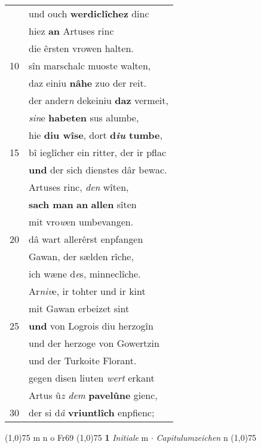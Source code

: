 \documentclass[8pt,a4paper,notitlepage]{article}
\begin{document}
\begin{table}[ht]
\begin{minipage}[t]{0.5\linewidth}
\begin{tabular}{rl}
 & und ouch \textbf{werdiclîchez} dinc\\ 
 & hiez \textbf{an} Artuses rinc\\ 
 & die êrsten vrowen halten.\\ 
10 & sîn marschalc muoste walten,\\ 
 & daz einiu \textbf{nâhe} zuo der reit.\\ 
 & der ander\textit{n} dekeiniu \textbf{daz} vermeit,\\ 
 & \textit{sin}e \textbf{habeten} sus alumbe,\\ 
 & hie \textbf{diu wîse}, dort \textbf{d\textit{iu} tumbe},\\ 
15 & bî ieglîcher ein ritter, der ir pflac\\ 
 & \textbf{und} der sich dienstes dâr bewac.\\ 
 & Artuses rinc, \textit{den} wîten,\\ 
 & \textbf{sach man} \textbf{an} \textbf{allen} sîten\\ 
 & mit vro\textit{w}en umbevangen.\\ 
20 & dâ wart allerêrst enpfangen\\ 
 & Gawan, der sælden rîche,\\ 
 & ich wæne d\textit{e}s, minneclîche.\\ 
 & Ar\textit{niv}e, ir tohter und ir kint\\ 
 & mit Gawan erbeizet sint\\ 
25 & \textbf{und} von Logrois diu herzogîn\\ 
 & und der herzoge von Gowertzin\\ 
 & und der Turkoite Florant.\\ 
 & gegen disen liuten \textit{wert} erkant\\ 
 & Artus û\textit{z dem} \textbf{pavelûne} gienc,\\ 
30 & der si d\textit{â} \textbf{vriuntlîch} enpfienc;\\ 
\end{tabular}
\scriptsize
\line(1,0){75} \newline
m n o Fr69 \newline
\line(1,0){75} \newline
\textbf{1} \textit{Initiale} m   $\cdot$ \textit{Capitulumzeichen} n  \newline
\line(1,0){75} \newline

\end{minipage}
\end{table}
\end{document}
